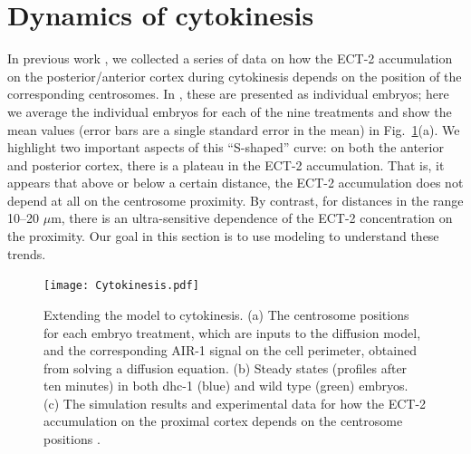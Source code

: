 \documentclass[11pt]{article}
\begin{document}
\section{Dynamics of cytokinesis}
In previous work \citep{longhini2022aurora}, we collected a series of data on how the ECT-2 accumulation on the posterior/anterior cortex during cytokinesis depends on the position of the corresponding centrosomes. In \citep[Fig.~7A]{longhini2022aurora}, these are presented as individual embryos; here we average the individual embryos for each of the nine treatments and show the mean values (error bars are a single standard error in the mean) in Fig.\ \ref{fig:CytoSit}(a). We highlight two important aspects of this ``S-shaped'' curve: on both the anterior and posterior cortex, there is a plateau in the ECT-2 accumulation. That is, it appears that above or below a certain distance, the ECT-2 accumulation does not depend at all on the centrosome proximity. By contrast, for distances in the range 10--20 $\mu$m, there is an ultra-sensitive dependence of the ECT-2 concentration on the proximity. Our goal in this section is to use modeling to understand these trends.

\begin{figure}
\centering
\texttt{[image: Cytokinesis.pdf]}
\caption{\label{fig:CytoSit} Extending the model to cytokinesis. (a) The centrosome positions for each embryo treatment, which are inputs to the diffusion model, and the corresponding AIR-1 signal on the cell perimeter, obtained from solving a diffusion equation. (b) Steady states (profiles after ten minutes)  in both dhc-1 (blue) and wild type (green) embryos. (c) The simulation results and experimental data for how the ECT-2 accumulation on the proximal cortex depends on the centrosome positions \citep[Fig.~7A]{longhini2022aurora}.}
\end{figure}
\end{document}
